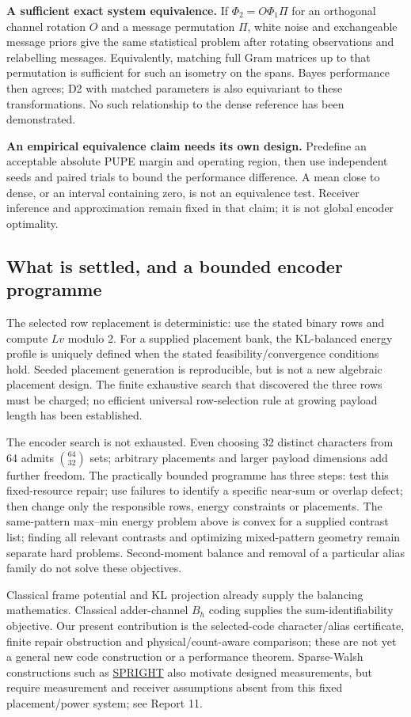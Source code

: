 \documentclass[10pt,a4paper]{article}
\begin{document}
\textbf{A sufficient exact system equivalence.} If $\Phi_2=O\Phi_1\Pi$ for an orthogonal channel rotation $O$ and
a message permutation $\Pi$, white noise and exchangeable message priors give the same statistical problem after
rotating observations and relabelling messages. Equivalently, matching full Gram matrices up to that permutation is
sufficient for such an isometry on the spans. Bayes performance then agrees; D2 with matched parameters is also
equivariant to these transformations. No such relationship to the dense reference has been demonstrated.

\textbf{An empirical equivalence claim needs its own design.} Predefine an acceptable absolute PUPE margin and
operating region, then use independent seeds and paired trials to bound the performance difference. A mean close to
dense, or an interval containing zero, is not an equivalence test. Receiver inference and approximation remain fixed
in that claim; it is not global encoder optimality.

\subsection{What is settled, and a bounded encoder programme}
The selected row replacement is deterministic: use the stated binary rows and compute $Lv$ modulo 2.
For a supplied placement bank, the KL-balanced energy profile is uniquely defined when the stated
feasibility/convergence conditions hold. Seeded placement generation is reproducible, but is not a new
algebraic placement design. The finite exhaustive search that discovered the three rows must be charged;
no efficient universal row-selection rule at growing payload length has been established.

The encoder search is not exhausted. Even choosing 32 distinct characters from 64 admits
$\binom{64}{32}$ sets; arbitrary placements and larger payload dimensions add further freedom.
The practically bounded programme has three steps: test this fixed-resource repair; use failures to
identify a specific near-sum or overlap defect; then change only the responsible rows, energy constraints
or placements. The same-pattern max--min energy problem above is convex for a supplied contrast list;
finding all relevant contrasts and optimizing mixed-pattern geometry remain separate hard problems.
Second-moment balance and removal of a particular alias family do not solve these objectives.

Classical frame potential and KL projection already supply the balancing mathematics. Classical
adder-channel $B_h$ coding supplies the sum-identifiability objective. Our present contribution is the
selected-code character/alias certificate, finite repair obstruction and physical/count-aware comparison;
these are not yet a general new code construction or a performance theorem. Sparse-Walsh constructions
such as \href{https://arxiv.org/abs/1508.06336}{SPRIGHT} also motivate designed measurements, but require
measurement and receiver assumptions absent from this fixed placement/power system; see Report 11.
\end{document}
